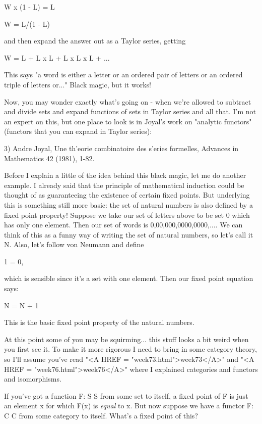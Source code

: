 W x (1 - L) = L

W = L/(1 - L)

and then expand the answer out as a Taylor series, getting

W = L  +  L x L  +  L x L x L  + ... 

This says "a word is either a letter or an ordered pair of letters or an
ordered triple of letters or..."  Black magic, but it works!

Now, you may wonder exactly what's going on - when we're allowed to
subtract and divide sets and expand functions of sets in Taylor series
and all that.  I'm not an expert on this, but one place to look is in
Joyal's work on "analytic functors" (functors that you can expand in
Taylor series):

3) Andre Joyal, Une th'eorie combinatoire des s'eries formelles,
Advances in Mathematics 42 (1981), 1-82.

Before I explain a little of the idea behind this black magic, let me do
another example.  I already said that the principle of mathematical
induction could be thought of as guaranteeing the existence of certain
fixed points.  But underlying this is something still more basic: the
set of natural numbers is also defined by a fixed point property!
Suppose we take our set of letters above to be set {0} which has only
one element.  Then our set of words is {0,00,000,0000,0000,...}.  We
can think of this as a funny way of writing the set of natural numbers,
so let's call it N.  Also, let's follow von Neumann and define

1 = {0}, 

which is sensible since it's a set with one element.  Then our fixed
point equation says:

N = N + 1

This is the basic fixed point property of the natural numbers.

At this point some of you may be squirming... this stuff looks a bit
weird when you first see it.  To make it more rigorous I need to bring
in some category theory, so I'll assume you've read "<A HREF = "week73.html">week73</A>" and
"<A HREF = "week76.html">week76</A>" where I explained categories and functors and isomorphisms.

If you've got a function F: S \to  S from some set to itself, a fixed
point of F is just an element x for which F(x) is \emph{equal} to x.  But now
suppose we have a functor F: C \to  C from some category to itself.
What's a fixed point of this?

